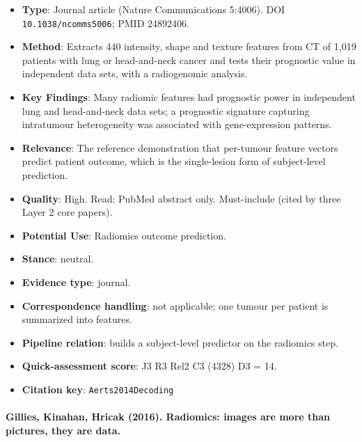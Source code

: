 \documentclass[journal,onecolumn]{IEEEtran}
\begin{document}
\begin{itemize}

\item{} \textbf{Type}: Journal article (Nature Communications 5:4006). DOI \nolinkurl{10.1038/ncomms5006}; PMID 24892406.

\item{} \textbf{Method}: Extracts 440 intensity, shape and texture features from CT of 1,019 patients with lung or head-and-neck cancer and tests their prognostic value in independent data sets, with a radiogenomic analysis.

\item{} \textbf{Key Findings}: Many radiomic features had prognostic power in independent lung and head-and-neck data sets; a prognostic signature capturing intratumour heterogeneity was associated with gene-expression patterns.

\item{} \textbf{Relevance}: The reference demonstration that per-tumour feature vectors predict patient outcome, which is the single-lesion form of subject-level prediction.

\item{} \textbf{Quality}: High. Read: PubMed abstract only. Must-include (cited by three Layer 2 core papers).

\item{} \textbf{Potential Use}: Radiomics outcome prediction.

\item{} \textbf{Stance}: neutral.

\item{} \textbf{Evidence type}: journal.

\item{} \textbf{Correspondence handling}: not applicable; one tumour per patient is summarized into features.

\item{} \textbf{Pipeline relation}: builds a subject-level predictor on the radiomics step.

\item{} \textbf{Quick-assessment score}: J3 R3 Rel2 C3 (4328) D3 = 14.

\item{} \textbf{Citation key}: \texttt{Aerts2014Decoding}

\end{itemize}

\paragraph{Gillies, Kinahan, Hricak (2016). Radiomics: images are more than pictures, they are data.~\cite{Gillies2016Radiomics}}\mbox{}
\end{document}
